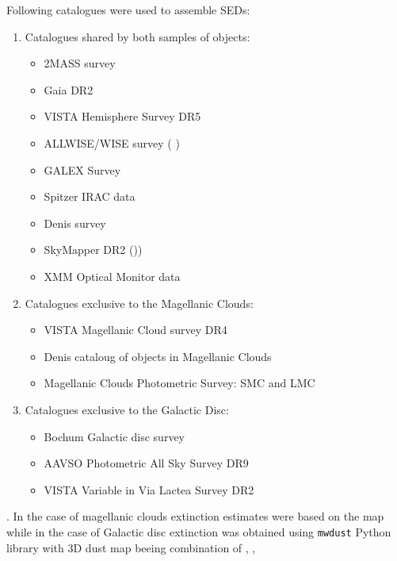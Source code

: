 \documentclass{pracalicmgr}
\begin{document}
Following catalogues were used to assemble SEDs:
\begin{enumerate}
\item Catalogues shared by both samples of objects:
\begin{itemize}
    \item 2MASS survey \citep{skrutskie_two_2006}
    \item Gaia DR2 \citep{gaia_collaboration_gaia_2018}
    \item VISTA Hemisphere Survey DR5 \citep{mcmahon_vizier_2021}
    \item ALLWISE/WISE survey (\citet*{wright_wide-field_2010} \citet*{cutri_vizier_2021})
    \item GALEX Survey \citep{bianchi_galex_2011}
    \item Spitzer IRAC data \citep{meixner_spitzer_2006}
    \item Denis survey  \citep{denis_vizier_2005}
    \item SkyMapper DR2 ()\citet*{wolf_skymapper_2018}\citet*{onken_skymapper_2019})
    \item XMM Optical Monitor data \citep{page_xmm-newton_2012}
\end{itemize}
\item Catalogues exclusive to the Magellanic Clouds:
\begin{itemize}
    \item VISTA Magellanic Cloud survey DR4 \citep{cioni_vizier_2017}
    \item Denis cataloug of objects in Magellanic Clouds \citep{cioni_denis_2000}
    \item Magellanic Clouds Photometric Survey: SMC and LMC \citep{zaritsky_magellanic_2002} \citep{zaritsky_magellanic_2004}
\end{itemize}
\item Catalogues exclusive to the Galactic Disc:
\begin{itemize}
    \item Bochum Galactic disc survey \citep{hackstein_bochum_2015}
    \item AAVSO Photometric All Sky Survey DR9 \citep{henden_apass_2015}
    \item VISTA Variable in Via Lactea Survey DR2 \citep{minniti_vizier_2017}
\end{itemize} 
\end{enumerate}. In the case of magellanic clouds extinction estimates were based on the map \citep{skowron_ogle-ing_2021} while in the case of Galactic disc extinction
was obtained using \texttt{mwdust} \citep{bovy_galactic_2016} Python library with 3D dust map beeing combination of \citep{green_3d_2019}, \citep{greiner_unusually_2001},
\end{document}
